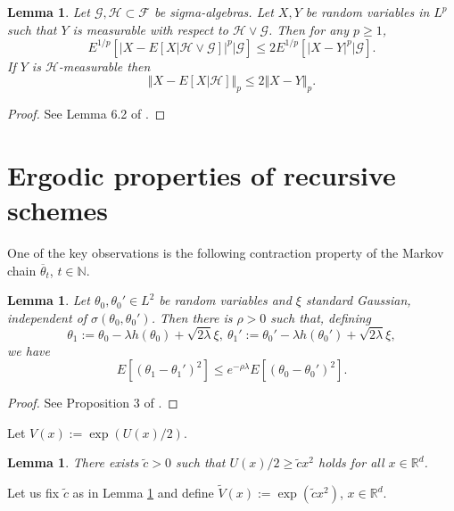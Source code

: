 \documentclass[a4paper,draft]{article}
\newtheorem{lemma}[theorem]{Lemma}
\begin{document}
\begin{lemma}\label{mall} Let $\mathcal{G},\mathcal{H}\subset\mathcal{F}$
be sigma-algebras. Let $X,Y$ be random variables in $L^p$ such that $Y$ is measurable with
	respect to $\mathcal{H}\vee\mathcal{G}$.
	Then for any $p\ge 1$,
	$$
	E^{1/p}\left[\vert X-E[X\vert\mathcal{H}\vee\mathcal{G}]\vert^p\big\vert \mathcal{G}\right]
	\leq 2E^{1/p}\left[\vert X-Y\vert^p\big\vert \mathcal{G}\right].
	$$
	If $Y$ is $\mathcal{H}$-measurable then
	\begin{equation}\label{dirk}
	\Vert X-E[X\vert\mathcal{H}]\Vert_p\leq 2 \Vert X-Y\Vert_p.
	\end{equation}
\end{lemma}
\begin{proof} See Lemma 6.2 of \cite{4}.
\end{proof}





\section{Ergodic properties of recursive schemes}

One of the key observations is the following contraction property
of the Markov chain $\overline{\theta}_t$, $t\in\mathbb{N}$.

\begin{lemma}\label{ghibli}
Let $\theta_0,\theta_0'\in L^2$ be random variables and $\xi$ standard
Gaussian, independent of $\sigma(\theta_0,\theta_0')$.
Then there is $\rho>0$
such that, defining
$$
\theta_1:=\theta_0-\lambda h(\theta_0)+\sqrt{2\lambda}\xi,\
\theta_1':=\theta_0'-\lambda h(\theta_0')+\sqrt{2\lambda}\xi,
$$
we have
$$
E[(\theta_1-\theta_1')^2]\leq e^{-\rho\lambda}E[(\theta_0-\theta_0')^2].
$$
\end{lemma}
\begin{proof}
See Proposition 3 of \cite{durmus-moulines}.
\end{proof}

Let $V(x):=\exp(U(x)/2)$.
\begin{lemma}\label{tilda} There exists $\tilde{c}>0$ such that $U(x)/2\geq \tilde{c}x^2$
holds for all $x\in\mathbb{R}^d$.
\end{lemma}

Let us fix $\tilde{c}$ as in Lemma \ref{tilda} and define $\tilde{V}(x):=
\exp(\tilde{c}x^2)$, $x\in\mathbb{R}^d$.
\end{document}
